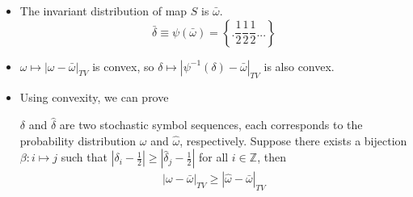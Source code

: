 \documentclass[12pt,t]{beamer}
\begin{document}
\begin{frame}
\begin{itemize}\setlength{\parskip}{0pt}  \setlength{\itemsep}{5pt} \setlength{\topsep}{0pt}
    \item The invariant distribution of map $S$ is $\bar{\omega}$.
          $$\bar{\delta}\equiv \psi(\bar{\omega}) = \left\{.\frac{1}{2}\frac{1}{2}\frac{1}{2}...\right\}  $$
    \item $\omega \mapsto |\omega-\bar{\omega}|_{TV}$ is convex, so  $\delta \mapsto |\psi^{-1}(\delta)-\bar{\omega}|_{TV} $ is also convex.
    \item Using convexity, we can prove
          \begin{lemma}
          \label{alldifflemma}
           $\delta$ and $\hat{\delta}$ are two stochastic symbol sequences, each corresponds to the probability distribution $\omega$ and $\hat{\omega}$, respectively. Suppose there exists a bijection $\beta: i \mapsto j$ such that $|\delta_i-\frac{1}{2}| \ge |\hat{\delta}_j-\frac{1}{2} |$ for all $i\in \mathbb{Z}$, then
          \begin{eqnarray}
          |\omega-\bar{\omega} |_{TV} \ge|\hat{\omega}-\bar{\omega} |_{TV}
          \end{eqnarray}
\end{lemma}
\end{itemize}

\end{frame}
\end{document}
